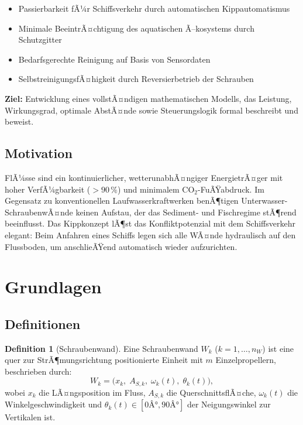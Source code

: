 ﻿\documentclass[a4paper,12pt]{article}
\theoremstyle{definition}
\newtheorem{definition}{Definition}
\begin{document}
\begin{itemize}
  \item Passierbarkeit fÃ¼r Schiffsverkehr durch automatischen Kippautomatismus
  \item Minimale BeeintrÃ¤chtigung des aquatischen Ã–kosystems durch Schutzgitter
  \item Bedarfsgerechte Reinigung auf Basis von Sensordaten
  \item SelbstreinigungsfÃ¤higkeit durch Reversierbetrieb der Schrauben
\end{itemize}

\textbf{Ziel:} Entwicklung eines vollstÃ¤ndigen mathematischen Modells, das Leistung,
Wirkungsgrad, optimale AbstÃ¤nde sowie Steuerungslogik formal beschreibt und beweist.

\subsection{Motivation}

FlÃ¼sse sind ein kontinuierlicher, wetterunabhÃ¤ngiger EnergietrÃ¤ger mit hoher
VerfÃ¼gbarkeit ($> 90\,\%$) und minimalem CO$_2$-FuÃŸabdruck. Im Gegensatz zu
konventionellen Laufwasserkraftwerken benÃ¶tigen Unterwasser-SchraubenwÃ¤nde keinen
Aufstau, der das Sediment- und Fischregime stÃ¶rend beeinflusst. Das Kippkonzept
lÃ¶st das Konfliktpotenzial mit dem Schiffsverkehr elegant: Beim Anfahren eines Schiffs
legen sich alle WÃ¤nde hydraulisch auf den Flussboden, um anschlieÃŸend automatisch
wieder aufzurichten.

\section{Grundlagen}

\subsection{Definitionen}

\begin{definition}[Schraubenwand]
Eine Schraubenwand $W_k$ ($k = 1, \ldots, n_W$) ist eine quer zur StrÃ¶mungsrichtung
positionierte Einheit mit $m$ Einzelpropellern, beschrieben durch:
\[
  W_k = \bigl(x_k,\; A_{S,k},\; \omega_k(t),\; \theta_k(t)\bigr),
\]
wobei $x_k$ die LÃ¤ngsposition im Fluss, $A_{S,k}$ die QuerschnittsflÃ¤che, $\omega_k(t)$
die Winkelgeschwindigkeit und $\theta_k(t) \in [0Â°, 90Â°]$ der Neigungswinkel zur
Vertikalen ist.
\end{definition}
\end{document}
